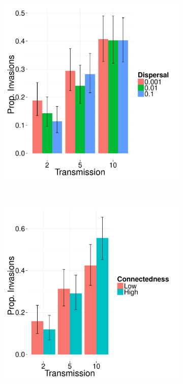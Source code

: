 \begin{figure}[b]
\centering
\begin{subfigure}[b]{0.35\textwidth}
  \centering
	\includegraphics[width=1\textwidth]{imgs/fig150327.pdf}
  \caption{}
  \label{fig:dispersalProbs}
\end{subfigure}
  ~ 
\begin{subfigure}[b]{0.35\textwidth}
  \centering
  \includegraphics[width=1\textwidth]{imgs/figs.pdf}
  \caption{}
  \label{fig:structureProbs}
\end{subfigure}%


\end{figure}
